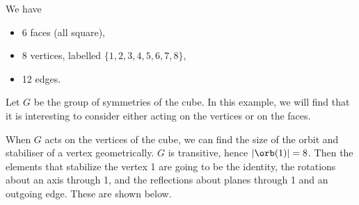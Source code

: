 \begin{center}
\begin{tikzpicture}[x=0.75pt,y=0.75pt,yscale=-1,xscale=1]
\end{tikzpicture}

\end{center}

We have
\begin{itemize}
	\item 6 faces (all square),
	\item 8 vertices, labelled $\{1, 2, 3, 4, 5, 6, 7, 8\}$,
	\item 12 edges.
\end{itemize}

Let $G$ be the group of symmetries of the cube. In this example, we will find that it is interesting to consider either acting on the vertices or on the faces.

When $G$ acts on the vertices of the cube, we can find the size of the orbit and stabiliser of a vertex geometrically. $G$ is transitive, hence $|\orb(1)| = 8$. Then the elements that stabilize the vertex 1 are going to be the identity, the rotations about an axis through 1, and the reflections about planes through 1 and an outgoing edge. These are shown below.
